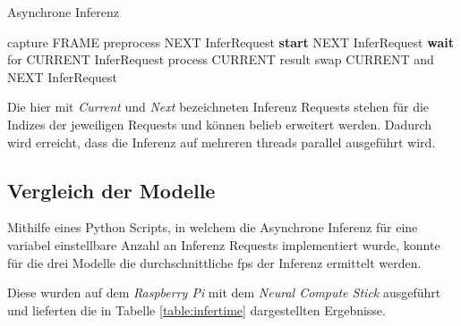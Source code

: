 \begin{minipage}{0.1\textwidth}
  \hfill
\end{minipage}
\begin{minipage}{0.5\textwidth}
  \begin{algorithm}[H]
    \caption{Asynchrone Inferenz}
    \label{code:async}
    \begin{algorithmic}
    \WHILE{\TRUE}
        \STATE capture FRAME
        \STATE preprocess NEXT InferRequest
        \STATE \textbf{start} NEXT InferRequest
          \STATE \textbf{wait} for CURRENT InferRequest
          \STATE process CURRENT result
          \STATE swap CURRENT and NEXT InferRequest
    \ENDWHILE
    \end{algorithmic}
  \end{algorithm}
\end{minipage}
\begin{minipage}{0.4\textwidth}
  \centering
  \vspace{1cm}
  \def\svgwidth{0.5\textwidth}
  
\end{minipage}

\vspace{1cm}

\begin{figure}[H]
  \centering
  \def\svgwidth{0.9\textwidth}
  
  \caption{}
  \label{fig:async}
\end{figure}

Die hier mit \textit{Current} und \textit{Next} bezeichneten 
Inferenz Requests stehen für die Indizes der jeweiligen Requests
und können belieb erweitert werden. 
Dadurch wird erreicht, dass die Inferenz auf mehreren \Glspl{thread} 
parallel ausgeführt wird.


\subsection{Vergleich der Modelle}

Mithilfe eines Python Scripts, in welchem die Asynchrone Inferenz 
für eine variabel einstellbare Anzahl an Inferenz Requests
implementiert wurde, konnte für die drei Modelle die 
durchschnittliche 
\Gls{fps} der Inferenz ermittelt werden.

Diese wurden auf dem \textit{Raspberry Pi} mit dem \textit{Neural Compute Stick} 
ausgeführt und lieferten die in Tabelle \ref{table:infertime}
dargestellten Ergebnisse.

